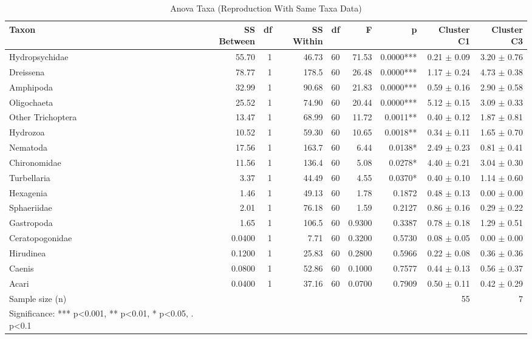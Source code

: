 \begin{table}[htbp]
  \centering
  \caption{Anova Taxa (Reproduction With Same Taxa Data)}
  \label{tab:reproduction_with_same_taxa_data_tables_anova_taxa}
  \small
  \begin{tabular}{lrrrrrrrr}
    \toprule
    Taxon & SS Between & df & SS Within & df  & F & p & Cluster C1 & Cluster C3 \\
    \midrule
    Hydropsychidae & 55.70 & 1 & 46.73 & 60 & 71.53 & 0.0000*** & 0.21 $\pm$ 0.09 & 3.20 $\pm$ 0.76 \\
    Dreissena & 78.77 & 1 & 178.5 & 60 & 26.48 & 0.0000*** & 1.17 $\pm$ 0.24 & 4.73 $\pm$ 0.38 \\
    Amphipoda & 32.99 & 1 & 90.68 & 60 & 21.83 & 0.0000*** & 0.59 $\pm$ 0.16 & 2.90 $\pm$ 0.58 \\
    Oligochaeta & 25.52 & 1 & 74.90 & 60 & 20.44 & 0.0000*** & 5.12 $\pm$ 0.15 & 3.09 $\pm$ 0.33 \\
    Other Trichoptera & 13.47 & 1 & 68.99 & 60 & 11.72 & 0.0011** & 0.40 $\pm$ 0.12 & 1.87 $\pm$ 0.81 \\
    Hydrozoa & 10.52 & 1 & 59.30 & 60 & 10.65 & 0.0018** & 0.34 $\pm$ 0.11 & 1.65 $\pm$ 0.70 \\
    Nematoda & 17.56 & 1 & 163.7 & 60 & 6.44 & 0.0138* & 2.49 $\pm$ 0.23 & 0.81 $\pm$ 0.41 \\
    Chironomidae & 11.56 & 1 & 136.4 & 60 & 5.08 & 0.0278* & 4.40 $\pm$ 0.21 & 3.04 $\pm$ 0.30 \\
    Turbellaria & 3.37 & 1 & 44.49 & 60 & 4.55 & 0.0370* & 0.40 $\pm$ 0.10 & 1.14 $\pm$ 0.60 \\
    Hexagenia & 1.46 & 1 & 49.13 & 60 & 1.78 & 0.1872 & 0.48 $\pm$ 0.13 & 0.00 $\pm$ 0.00 \\
    Sphaeriidae & 2.01 & 1 & 76.18 & 60 & 1.59 & 0.2127 & 0.86 $\pm$ 0.16 & 0.29 $\pm$ 0.22 \\
    Gastropoda & 1.65 & 1 & 106.5 & 60 & 0.9300 & 0.3387 & 0.78 $\pm$ 0.18 & 1.29 $\pm$ 0.51 \\
    Ceratopogonidae & 0.0400 & 1 & 7.71 & 60 & 0.3200 & 0.5730 & 0.08 $\pm$ 0.05 & 0.00 $\pm$ 0.00 \\
    Hirudinea & 0.1200 & 1 & 25.83 & 60 & 0.2800 & 0.5966 & 0.22 $\pm$ 0.08 & 0.36 $\pm$ 0.36 \\
    Caenis & 0.0800 & 1 & 52.86 & 60 & 0.1000 & 0.7577 & 0.44 $\pm$ 0.13 & 0.56 $\pm$ 0.37 \\
    Acari & 0.0400 & 1 & 37.16 & 60 & 0.0700 & 0.7909 & 0.50 $\pm$ 0.11 & 0.42 $\pm$ 0.29 \\
    Sample size (n) &  &  &  &  &  &  & 55 & 7 \\
    Significance: *** p<0.001, ** p<0.01, * p<0.05, . p<0.1 &  &  &  &  &  &  &  &  \\
    \bottomrule
  \end{tabular}
\end{table}
